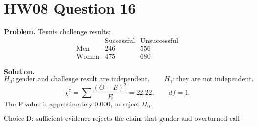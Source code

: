 \documentclass[11pt]{article}
\begin{document}
\section*{HW08 Question 16}

\textbf{Problem.} Tennis challenge results:
\[
\begin{array}{c|cc}
 & \text{Successful} & \text{Unsuccessful}\\ \hline
\text{Men} & 246 & 556\\
\text{Women} & 475 & 680
\end{array}
\]

\textbf{Solution.}
\[
H_0:\text{gender and challenge result are independent},\qquad
H_1:\text{they are not independent}.
\]
\[
\chi^2=\sum\frac{(O-E)^2}{E}=22.22,\qquad df=1.
\]
The P-value is approximately \(0.000\), so reject \(H_0\).

\[
\boxed{\text{Choice D: sufficient evidence rejects the claim that gender and overturned-call status are independent.}}
\]
\end{document}
